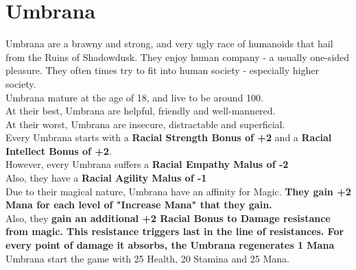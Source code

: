 \section{Umbrana}\label{race:umbrana}
Umbrana are a brawny and strong, and very ugly race of humanoids that hail from the Ruins of Shadowdusk.
They enjoy human company - a usually one-sided pleasure.
They often times try to fit into human society - especially higher society.\\
Umbrana mature at the age of 18, and live to be around 100.\\
At their best, Umbrana are helpful, friendly and well-mannered.\\
At their worst, Umbrana are insecure, distractable and superficial.\\
Every Umbrana starts with a \textbf{Racial Strength Bonus of +2} and a \textbf{Racial Intellect Bonus of +2}.\\
However, every Umbrana suffers a \textbf{Racial Empathy Malus of -2}\\
Also, they have a \textbf{Racial Agility Malus of -1}\\
Due to their magical nature, Umbrana have an affinity for Magic. \textbf{They gain +2 Mana for each level of "Increase Mana" that they gain.}\\
Also, they \textbf{gain an additional +2 Racial Bonus to Damage resistance from magic.
This resistance triggers last in the line of resistances.
For every point of damage it absorbs, the Umbrana regenerates 1 Mana}\\
Umbrana start the game with 25 Health, 20 Stamina and 25 Mana.